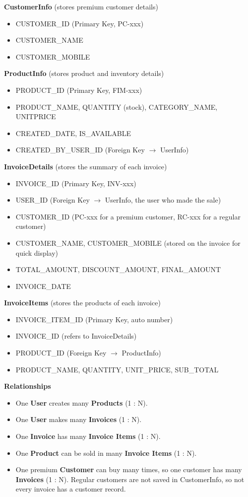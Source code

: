 \documentclass[12pt,a4paper]{article}
\begin{document}
\textbf{CustomerInfo} (stores premium customer details)
\begin{itemize}
\item CUSTOMER\_ID (Primary Key, PC-xxx)
\item CUSTOMER\_NAME
\item CUSTOMER\_MOBILE
\end{itemize}

\textbf{ProductInfo} (stores product and inventory details)
\begin{itemize}
\item PRODUCT\_ID (Primary Key, FIM-xxx)
\item PRODUCT\_NAME, QUANTITY (stock), CATEGORY\_NAME, UNITPRICE
\item CREATED\_DATE, IS\_AVAILABLE
\item CREATED\_BY\_USER\_ID (Foreign Key $\rightarrow$ UserInfo)
\end{itemize}

\textbf{InvoiceDetails} (stores the summary of each invoice)
\begin{itemize}
\item INVOICE\_ID (Primary Key, INV-xxx)
\item USER\_ID (Foreign Key $\rightarrow$ UserInfo, the user who made the sale)
\item CUSTOMER\_ID (PC-xxx for a premium customer, RC-xxx for a regular customer)
\item CUSTOMER\_NAME, CUSTOMER\_MOBILE (stored on the invoice for quick display)
\item TOTAL\_AMOUNT, DISCOUNT\_AMOUNT, FINAL\_AMOUNT
\item INVOICE\_DATE
\end{itemize}

\textbf{InvoiceItems} (stores the products of each invoice)
\begin{itemize}
\item INVOICE\_ITEM\_ID (Primary Key, auto number)
\item INVOICE\_ID (refers to InvoiceDetails)
\item PRODUCT\_ID (Foreign Key $\rightarrow$ ProductInfo)
\item PRODUCT\_NAME, QUANTITY, UNIT\_PRICE, SUB\_TOTAL
\end{itemize}

\textbf{Relationships}
\begin{itemize}
\item One \textbf{User} creates many \textbf{Products} (1 : N).
\item One \textbf{User} makes many \textbf{Invoices} (1 : N).
\item One \textbf{Invoice} has many \textbf{Invoice Items} (1 : N).
\item One \textbf{Product} can be sold in many \textbf{Invoice Items} (1 : N).
\item One premium \textbf{Customer} can buy many times, so one customer has many \textbf{Invoices} (1 : N). Regular customers are not saved in CustomerInfo, so not every invoice has a customer record.
\end{itemize}
\end{document}
